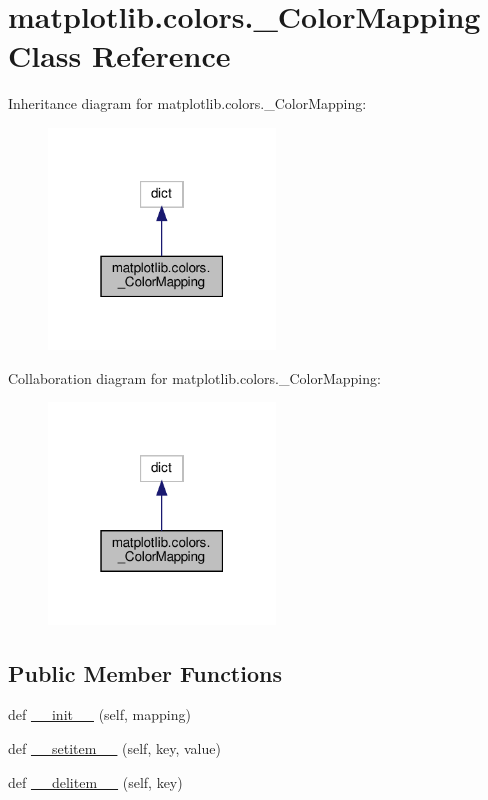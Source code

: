 \hypertarget{classmatplotlib_1_1colors_1_1__ColorMapping}{}\section{matplotlib.\+colors.\+\_\+\+Color\+Mapping Class Reference}
\label{classmatplotlib_1_1colors_1_1__ColorMapping}


Inheritance diagram for matplotlib.\+colors.\+\_\+\+Color\+Mapping\+:
\nopagebreak
\begin{figure}[H]
\begin{center}
\leavevmode
\includegraphics[width=171pt]{classmatplotlib_1_1colors_1_1__ColorMapping__inherit__graph}
\end{center}
\end{figure}


Collaboration diagram for matplotlib.\+colors.\+\_\+\+Color\+Mapping\+:
\nopagebreak
\begin{figure}[H]
\begin{center}
\leavevmode
\includegraphics[width=171pt]{classmatplotlib_1_1colors_1_1__ColorMapping__coll__graph}
\end{center}
\end{figure}
\subsection*{Public Member Functions}
\begin{DoxyCompactItemize}
\item 
def \hyperlink{classmatplotlib_1_1colors_1_1__ColorMapping_ad8875f2dfce44cf554bfdad298d759dc}{\+\_\+\+\_\+init\+\_\+\+\_\+} (self, mapping)
\item 
def \hyperlink{classmatplotlib_1_1colors_1_1__ColorMapping_abf379a6a848687b0dac6f6bd1691c637}{\+\_\+\+\_\+setitem\+\_\+\+\_\+} (self, key, value)
\item 
def \hyperlink{classmatplotlib_1_1colors_1_1__ColorMapping_a2671f5ed190846deff9c524916eb58a0}{\+\_\+\+\_\+delitem\+\_\+\+\_\+} (self, key)
\end{DoxyCompactItemize}

